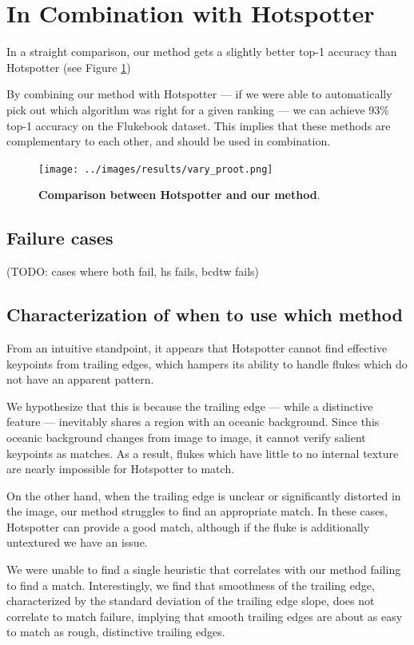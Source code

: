 \section{In Combination with Hotspotter}

In a straight comparison, our method gets a slightly better top-1 accuracy than Hotspotter (see Figure \ref{fig:vary_proot})

By combining our method with Hotspotter --- if we were able to automatically pick out which algorithm was right for a given ranking --- we can achieve 93\% top-1 accuracy on the Flukebook dataset.
This implies that these methods are complementary to each other, and should be used in combination.


\begin{figure}[t]%
\centering
\texttt{[image: ../images/results/vary\_proot.png]}
\caption{\textbf{Comparison between Hotspotter and our method}.}
\label{fig:vary_proot}
\end{figure}

\subsection{Failure cases}

(TODO: cases where both fail, hs fails, bcdtw fails)

\subsection{Characterization of when to use which method}

From an intuitive standpoint, it appears that Hotspotter cannot find effective keypoints from trailing edges, which hampers its ability to handle flukes which do not have an apparent pattern.

We hypothesize that this is because the trailing edge --- while a distinctive feature --- inevitably shares a region with an oceanic background.
Since this oceanic background changes from image to image, it cannot verify salient keypoints as matches.
As a result, flukes which have little to no internal texture are nearly impossible for Hotspotter to match.

On the other hand, when the trailing edge is unclear or significantly distorted in the image, our method struggles to find an appropriate match.
In these cases, Hotspotter can provide a good match, although if the fluke is additionally untextured we have an issue.


We were unable to find a single heuristic that correlates with our method failing to find a match.
Interestingly, we find that smoothness of the trailing edge, characterized by the standard deviation of the trailing edge slope, does not correlate to match failure, implying that smooth trailing edges are about as easy to match as rough, distinctive trailing edges.

